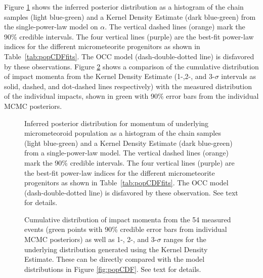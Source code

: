 \documentclass[twocolumn, trackchanges]{aastex62}
\begin{document}
Figure \ref{fig:PDF_P} shows the inferred posterior distribution as a histogram of the chain samples (light blue-green) and a Kernel Density Estimate (dark blue-green) from the single-power-law model on $\alpha$. The vertical dashed lines (orange) mark the 90\% credible intervals.  The four vertical lines (purple) are the best-fit power-law indices for the different micrometeorite progenitors as shown in Table~\ref{tab:popCDFfits}. The OCC model (dash-double-dotted line) is disfavored by these observations. Figure \ref{fig:CDF_P} shows a comparison of the cumulative distribution of impact momenta from the Kernel Density Estimate (1-,2-, and 3-$\sigma$ intervals as solid, dashed, and dot-dashed lines respectively) with the measured distribution of the individual impacts, shown in green with 90\% error bars from the individual MCMC posteriors. 

\begin{figure}[h!]
\vspace*{-8mm}
\caption{Inferred posterior distribution for momentum of underlying micrometeoroid population as a histogram of the chain samples (light blue-green) and a Kernel Density Estimate (dark blue-green) from a single-power-law model. The vertical dashed lines (orange) mark the 90\% credible intervals.  The four vertical lines (purple) are the best-fit power-law indices for the different micrometeorite progenitors as shown in Table~\ref{tab:popCDFfits}. The OCC model (dash-double-dotted line) is disfavored by these observation. See text for details. \label{fig:PDF_P}}
\end{figure}

\begin{figure}[h!]
\vspace*{-8mm}
\caption{Cumulative distribution of impact momenta from the 54 measured events (green points with 90\% credible error bars from individual MCMC posteriors) as well as 1-, 2-, and 3-$\sigma$ ranges for the underlying distribution generated using the Kernel Density Estimate. These can be directly compared with the model distributions in Figure \ref{fig:popCDF}. See text for details. \label{fig:CDF_P}}
\end{figure}
\end{document}
